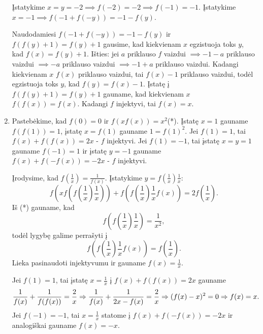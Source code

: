 \begin{enumerate}
Įstatykime $x=y=-2 \implies f(-2)=-2 \implies f(-1)=-1$.
Įstatykime $x=-1 \implies f(-1+f(-y))=-1-f(y)$.

Naudodamiesi $f(-1+f(-y))=-1-f(y)$ ir $f(f(y)+1)=f(y)+1$ gausime, kad
kiekvienam $x$ egzistuoja toks $y$, kad $f(x)=f(y)+1$. Išties: jei
$a$ priklauso $f$ vaizdui $\implies -1 -a$ priklauso vaizdui
$\implies -a$ priklauso vaizdui $\implies -1 + a$ priklauso
vaizdui. Kadangi kiekvienam $x$ $f(x)$ priklauso vaizdui, tai $f(x)-1$
priklauso vaizdui, todėl egzistuoja toks $y$, kad $f(y)=f(x)-1$.
Įstatę į $f(f(y)+1)=f(y)+1$ gauname, kad kiekvienam $x$
$f(f(x))=f(x)$. Kadangi $f$ injektyvi, tai $f(x)=x$.
\item 
Pastebėkime, kad $f(0)=0$ ir $f(xf(x))=x^2$(*). Įstatę $x=1$ gauname
$f(f(1))=1$, įstatę $x=f(1)$ gauname $1=f(1)^2$. Jei $f(1)=1$, tai
$f(x)+f(f(x))=2x$ - $f$ injektyvi. Jei $f(1)=-1$, tai įstatę $x=y=1$
gauname $f(-1)=1$ ir įstatę $y=-1$ gauname $f(x)+f(-f(x))=-2x$ - $f$
injektyvi.

Įrodysime, kad $f(\frac{1}{x})= \frac{1}{f(x)}$. Įstatykime
$y=f(\frac{1}{x})\frac{1}{x}$: $$f(xf(f(\frac{1}{x})\frac{1}{x}))+
f(f(\frac{1}{x})\frac{1}{x}f(x))=2f(\frac{1}{x}).$$
Iš (*) gauname, kad $$f(f(\frac{1}{x})\frac{1}{x}) = \frac{1}{x^2},$$
todėl lygybę galime perrašyti į
$$f(f(\frac{1}{x})\frac{1}{x}f(x))=f(\frac{1}{x}).$$ Lieka pasinaudoti
injektyvumu ir gauname $f(x)=\frac{1}{x}$.

Jei $f(1)=1$, tai įstatę $x=\frac{1}{x}$ į $f(x)+f(f(x))=2x$ gauname
$$\frac{1}{f(x)} + \frac{1}{f(f(x))}= \frac{2}{x} \Rightarrow \\
\frac{1}{f(x)} + \frac{1}{2x - f(x)}= \frac{2}{x} \\ \Rightarrow
(f(x)-x)^2=0 \Rightarrow f(x)=x.$$
Jei $f(-1)=-1$, tai $x = \frac{1}{x}$ statome į $f(x)+f(-f(x))=-2x$ ir
analogiškai gauname $f(x) = -x$.
\end{enumerate} 
